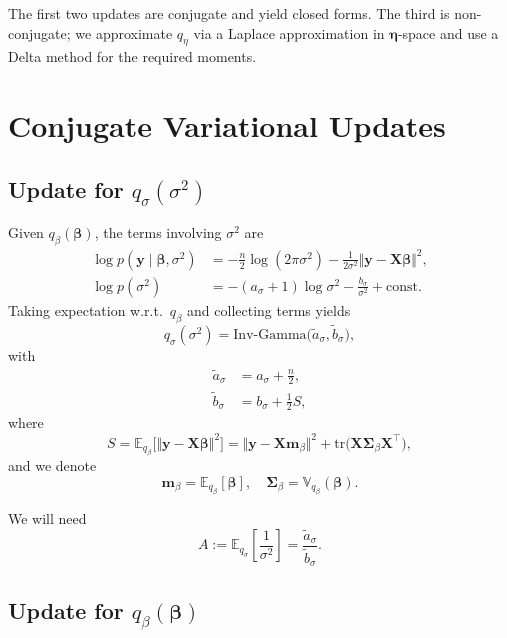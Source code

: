 \documentclass[11pt]{article}
\newcommand{\vect}[1]{\boldsymbol{#1}}
\newcommand{\mat}[1]{\mathbf{#1}}
\newcommand{\E}{\mathbb{E}}
\newcommand{\Var}{\mathbb{V}}
\newcommand{\IG}{\mathrm{Inv\text{-}Gamma}}
\begin{document}
The first two updates are conjugate and yield closed forms. The third is non-conjugate; we approximate $q_\eta$ via a Laplace approximation in $\vect{\eta}$-space and use a Delta method for the required moments.

\section{Conjugate Variational Updates}

\subsection{Update for $q_\sigma(\sigma^2)$}

Given $q_\beta(\vect{\beta})$, the terms involving $\sigma^2$ are
\begin{align}
  \log p(\vect{y} \mid \vect{\beta},\sigma^2)
  &=
  -\frac{n}{2}\log(2\pi\sigma^2)
  -\frac{1}{2\sigma^2} \Vert \vect{y} - \mat{X}\vect{\beta} \Vert^2,\\
  \log p(\sigma^2)
  &=
  -(a_\sigma+1)\log \sigma^2 - \frac{b_\sigma}{\sigma^2} + \text{const}.
\end{align}
Taking expectation w.r.t.\ $q_\beta$ and collecting terms yields
\begin{equation}
  q_\sigma(\sigma^2)
  = \IG\big(\tilde{a}_\sigma, \tilde{b}_\sigma\big),
\end{equation}
with
\begin{align}
  \tilde{a}_\sigma 
  &= a_\sigma + \frac{n}{2},\\
  \tilde{b}_\sigma 
  &= b_\sigma + \frac{1}{2} S,
\end{align}
where
\begin{equation}
  S = \E_{q_\beta}\big[\Vert \vect{y} - \mat{X}\vect{\beta} \Vert^2\big]
    = \Vert \vect{y} - \mat{X}\vect{m}_\beta \Vert^2
      + \mathrm{tr}\big( \mat{X}\mat{\Sigma}_\beta \mat{X}^\top \big),
\end{equation}
and we denote
\[
  \vect{m}_\beta = \E_{q_\beta}[\vect{\beta}], 
  \quad \mat{\Sigma}_\beta = \Var_{q_\beta}(\vect{\beta}).
\]

We will need
\begin{equation}
  A := \E_{q_\sigma}\left[\frac{1}{\sigma^2}\right]
  = \frac{\tilde{a}_\sigma}{\tilde{b}_\sigma}.
\end{equation}

\subsection{Update for $q_\beta(\vect{\beta})$}
\end{document}
